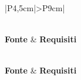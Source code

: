 \bgroup
\begin{adjustwidth}{-0.5cm}{-0.5cm}
  \begin{longtable}{|P{4,5cm}|>{\arraybackslash}P{9cm}|}
    \caption{Fonti - Requisiti funzionali}
  	\label{tab:fonti-requisiti-funzionali} \\
    \hline
    \textbf{Fonte} & \textbf{Requisiti} \\
    \hline
    \endfirsthead

    \caption[]{Fonti - Requisiti funzionali (continua)} \\
		\hline
    \textbf{Fonte} & \textbf{Requisiti} \\
    \hline
		\endhead

    \hline
		 \\ 
		\hline
		\endfoot

    \hline
		\endlastfoot


\end{longtable}
\end{adjustwidth}
